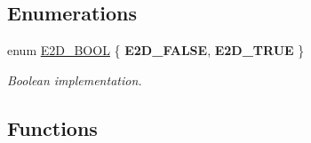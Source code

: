 \subsection*{Enumerations}
\begin{DoxyCompactItemize}
\item 
enum \hyperlink{group__Ez2DS_gaac8cdc3a3bcd6b56a8c3e0bb6979cbf8}{E2\-D\-\_\-\-B\-O\-O\-L} \{ {\bfseries E2\-D\-\_\-\-F\-A\-L\-S\-E}, 
{\bfseries E2\-D\-\_\-\-T\-R\-U\-E}
 \}
\begin{DoxyCompactList}\small\item\em Boolean implementation. \end{DoxyCompactList}\end{DoxyCompactItemize}
\subsection*{Functions}
